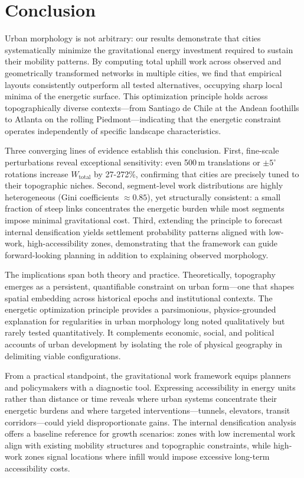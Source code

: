 \documentclass[twocolumn,amsmath,amssymb,floatfix,nature,shownopacs,footinbib,superscriptaddress]{revtex4-1} %
\begin{document}
\section*{Conclusion}

Urban morphology is not arbitrary: our results demonstrate that cities systematically minimize the gravitational energy investment required to sustain their mobility patterns.
By computing total uphill work across observed and geometrically transformed networks in multiple cities, we find that empirical layouts consistently outperform all tested alternatives, occupying sharp local minima of the energetic surface.
This optimization principle holds across topographically diverse contexts—from Santiago de Chile at the Andean foothills to Atlanta on the rolling Piedmont—indicating that the energetic constraint operates independently of specific landscape characteristics.

Three converging lines of evidence establish this conclusion.
First, fine-scale perturbations reveal exceptional sensitivity: even 500\,m translations or $\pm5^{\circ}$ rotations increase $W_{\text{total}}$ by 27-272\%, confirming that cities are precisely tuned to their topographic niches.
Second, segment-level work distributions are highly heterogeneous (Gini coefficients $\approx 0.85$), yet structurally consistent: a small fraction of steep links concentrates the energetic burden while most segments impose minimal gravitational cost.
Third, extending the principle to forecast internal densification yields settlement probability patterns aligned with low-work, high-accessibility zones, demonstrating that the framework can guide forward-looking planning in addition to explaining observed morphology.

The implications span both theory and practice.
Theoretically, topography emerges as a persistent, quantifiable constraint on urban form—one that shapes spatial embedding across historical epochs and institutional contexts.
The energetic optimization principle provides a parsimonious, physics-grounded explanation for regularities in urban morphology long noted qualitatively but rarely tested quantitatively.
It complements economic, social, and political accounts of urban development by isolating the role of physical geography in delimiting viable configurations.

From a practical standpoint, the gravitational work framework equips planners and policymakers with a diagnostic tool.
Expressing accessibility in energy units rather than distance or time reveals where urban systems concentrate their energetic burdens and where targeted interventions—tunnels, elevators, transit corridors—could yield disproportionate gains.
The internal densification analysis offers a baseline reference for growth scenarios: zones with low incremental work align with existing mobility structures and topographic constraints, while high-work zones signal locations where infill would impose excessive long-term accessibility costs.
\end{document}
